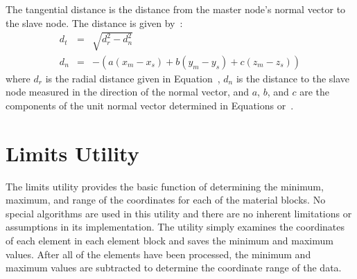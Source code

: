 The tangential distance is the distance from the master node's normal
vector to the slave node.  The distance is given by~\cite{Rogers:pefcg}:
\begin{eqnarray}
d_t &=& \sqrt{d_r^2 - d_n^2}\label{distt}  \\
d_n &=& -\left(a(x_m - x_s) + b(y_m - y_s)+c(z_m-z_s)\right)\label{distn}
\end{eqnarray}
where $d_r$ is the radial distance given in Equation~, $d_n$
is the distance to the slave node measured in the direction of the
normal vector, and $a$, $b$, and $c$ are the components of the unit
normal vector determined in Equations  or~. 

\section{Limits Utility}  

The limits utility provides the basic function of determining the
minimum, maximum, and range of the coordinates for each of the material
blocks.  No special algorithms are used in this utility and there are no
inherent limitations or assumptions in its implementation. The utility
simply examines the coordinates of each element in each element block
and saves the minimum and maximum values.  After all of the elements
have been processed, the minimum and maximum values are subtracted to
determine the coordinate range of the data. 

